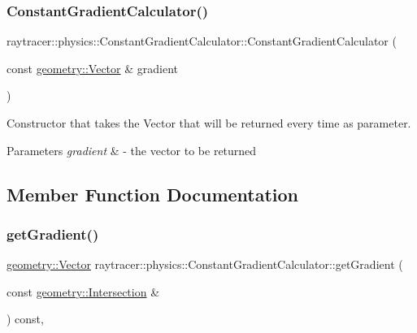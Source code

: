 \subsubsection{\texorpdfstring{Constant\+Gradient\+Calculator()}{ConstantGradientCalculator()}}
{\footnotesize\ttfamily raytracer\+::physics\+::\+Constant\+Gradient\+Calculator\+::\+Constant\+Gradient\+Calculator (\begin{DoxyParamCaption}\item[{const \hyperlink{classraytracer_1_1geometry_1_1Vector}{geometry\+::\+Vector} \&}]{gradient }\end{DoxyParamCaption})\hspace{0.3cm}{\ttfamily [explicit]}}



Constructor that takes the Vector that will be returned every time as parameter. 


\begin{DoxyParams}{Parameters}
{\em gradient} & -\/ the vector to be returned \\
\hline
\end{DoxyParams}


\subsection{Member Function Documentation}
\mbox{\label{classraytracer_1_1physics_1_1ConstantGradientCalculator_a62913e68275b1c46893db6fcc74a387f}} 
\subsubsection{\texorpdfstring{get\+Gradient()}{getGradient()}}
{\footnotesize\ttfamily \hyperlink{classraytracer_1_1geometry_1_1Vector}{geometry\+::\+Vector} raytracer\+::physics\+::\+Constant\+Gradient\+Calculator\+::get\+Gradient (\begin{DoxyParamCaption}\item[{const \hyperlink{structraytracer_1_1geometry_1_1Intersection}{geometry\+::\+Intersection} \&}]{ }\end{DoxyParamCaption}) const\hspace{0.3cm}{\ttfamily [override]}, {\ttfamily [virtual]}}



